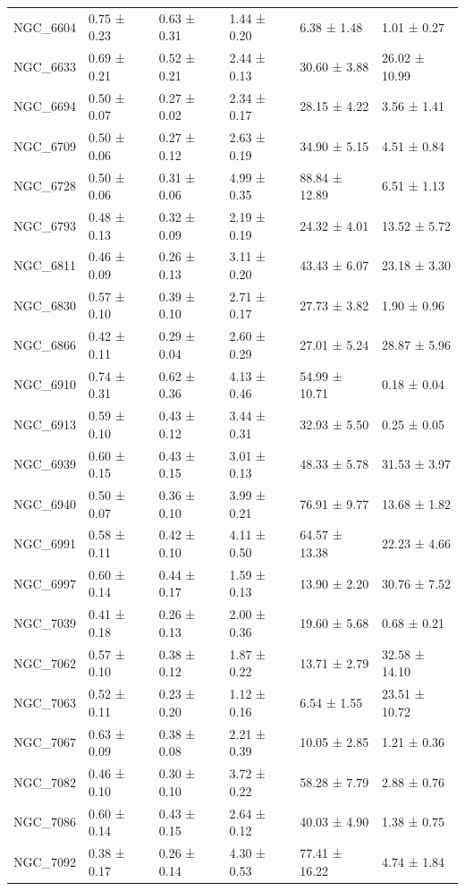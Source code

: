 \begin{tabular}{llllll}
NGC_6604 & 0.75 ± 0.23 & 0.63 ± 0.31 & 1.44 ± 0.20 & 6.38 ± 1.48 & 1.01 ± 0.27 \\
NGC_6633 & 0.69 ± 0.21 & 0.52 ± 0.21 & 2.44 ± 0.13 & 30.60 ± 3.88 & 26.02 ± 10.99 \\
NGC_6694 & 0.50 ± 0.07 & 0.27 ± 0.02 & 2.34 ± 0.17 & 28.15 ± 4.22 & 3.56 ± 1.41 \\
NGC_6709 & 0.50 ± 0.06 & 0.27 ± 0.12 & 2.63 ± 0.19 & 34.90 ± 5.15 & 4.51 ± 0.84 \\
NGC_6728 & 0.50 ± 0.06 & 0.31 ± 0.06 & 4.99 ± 0.35 & 88.84 ± 12.89 & 6.51 ± 1.13 \\
NGC_6793 & 0.48 ± 0.13 & 0.32 ± 0.09 & 2.19 ± 0.19 & 24.32 ± 4.01 & 13.52 ± 5.72 \\
NGC_6811 & 0.46 ± 0.09 & 0.26 ± 0.13 & 3.11 ± 0.20 & 43.43 ± 6.07 & 23.18 ± 3.30 \\
NGC_6830 & 0.57 ± 0.10 & 0.39 ± 0.10 & 2.71 ± 0.17 & 27.73 ± 3.82 & 1.90 ± 0.96 \\
NGC_6866 & 0.42 ± 0.11 & 0.29 ± 0.04 & 2.60 ± 0.29 & 27.01 ± 5.24 & 28.87 ± 5.96 \\
NGC_6910 & 0.74 ± 0.31 & 0.62 ± 0.36 & 4.13 ± 0.46 & 54.99 ± 10.71 & 0.18 ± 0.04 \\
NGC_6913 & 0.59 ± 0.10 & 0.43 ± 0.12 & 3.44 ± 0.31 & 32.93 ± 5.50 & 0.25 ± 0.05 \\
NGC_6939 & 0.60 ± 0.15 & 0.43 ± 0.15 & 3.01 ± 0.13 & 48.33 ± 5.78 & 31.53 ± 3.97 \\
NGC_6940 & 0.50 ± 0.07 & 0.36 ± 0.10 & 3.99 ± 0.21 & 76.91 ± 9.77 & 13.68 ± 1.82 \\
NGC_6991 & 0.58 ± 0.11 & 0.42 ± 0.10 & 4.11 ± 0.50 & 64.57 ± 13.38 & 22.23 ± 4.66 \\
NGC_6997 & 0.60 ± 0.14 & 0.44 ± 0.17 & 1.59 ± 0.13 & 13.90 ± 2.20 & 30.76 ± 7.52 \\
NGC_7039 & 0.41 ± 0.18 & 0.26 ± 0.13 & 2.00 ± 0.36 & 19.60 ± 5.68 & 0.68 ± 0.21 \\
NGC_7062 & 0.57 ± 0.10 & 0.38 ± 0.12 & 1.87 ± 0.22 & 13.71 ± 2.79 & 32.58 ± 14.10 \\
NGC_7063 & 0.52 ± 0.11 & 0.23 ± 0.20 & 1.12 ± 0.16 & 6.54 ± 1.55 & 23.51 ± 10.72 \\
NGC_7067 & 0.63 ± 0.09 & 0.38 ± 0.08 & 2.21 ± 0.39 & 10.05 ± 2.85 & 1.21 ± 0.36 \\
NGC_7082 & 0.46 ± 0.10 & 0.30 ± 0.10 & 3.72 ± 0.22 & 58.28 ± 7.79 & 2.88 ± 0.76 \\
NGC_7086 & 0.60 ± 0.14 & 0.43 ± 0.15 & 2.64 ± 0.12 & 40.03 ± 4.90 & 1.38 ± 0.75 \\
NGC_7092 & 0.38 ± 0.17 & 0.26 ± 0.14 & 4.30 ± 0.53 & 77.41 ± 16.22 & 4.74 ± 1.84 \\

\end{tabular}
